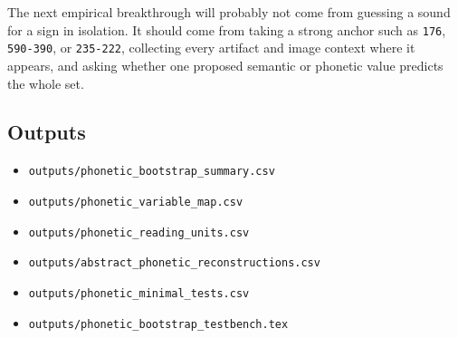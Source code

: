 The next empirical breakthrough will probably not come from guessing a sound for a sign in isolation. It should come from taking a strong anchor such as \texttt{176}, \texttt{590-390}, or \texttt{235-222}, collecting every artifact and image context where it appears, and asking whether one proposed semantic or phonetic value predicts the whole set.

\subsection{Outputs}

\begin{itemize}
  \item \texttt{outputs/phonetic\_bootstrap\_summary.csv}
  \item \texttt{outputs/phonetic\_variable\_map.csv}
  \item \texttt{outputs/phonetic\_reading\_units.csv}
  \item \texttt{outputs/abstract\_phonetic\_reconstructions.csv}
  \item \texttt{outputs/phonetic\_minimal\_tests.csv}
  \item \texttt{outputs/phonetic\_bootstrap\_testbench.tex}
\end{itemize}
